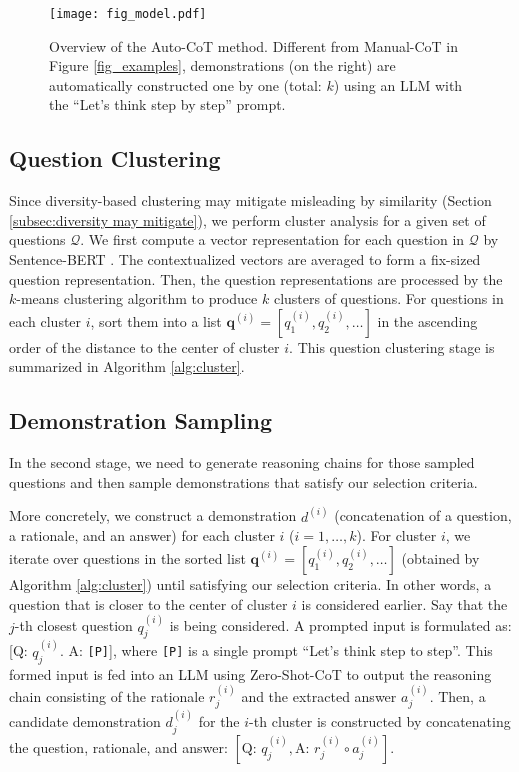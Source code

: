 \begin{figure}[htb]
  \begin{center}
   \texttt{[image: fig\_model.pdf]}
  \end{center}
  \caption{Overview of the Auto-CoT method. Different from Manual-CoT in Figure \ref{fig_examples}, demonstrations (on the right) are automatically constructed one by one (total: $k$) using an LLM with the ``Let's think step by step'' prompt.}
  \label{fig_overview}
\end{figure}

\subsection{Question Clustering} 

Since diversity-based clustering may mitigate misleading by similarity
(Section \ref{subsec:diversity may mitigate}), we perform cluster analysis for a given set of questions $\mathcal{Q}$. 
We first compute a vector representation for each question in $\mathcal{Q}$ by Sentence-BERT \citep{reimers-2019-sentence-bert}. 
The contextualized vectors are averaged to form a fix-sized question representation. Then, the question representations are processed by the $k$-means clustering algorithm
to produce $k$ clusters of questions. For questions in each cluster $i$, sort them into a list $\mathbf{q}^{(i)} = [q_1^{(i)}, q_2^{(i)}, \ldots]$ in the ascending order of the distance to the center of cluster $i$.
This question clustering stage is summarized in Algorithm \ref{alg:cluster}.

\subsection{Demonstration Sampling} 
In the second stage, we need to generate reasoning chains for those sampled questions and then sample demonstrations that satisfy our selection criteria.

More concretely, we construct a demonstration $d^{(i)}$ (concatenation of a question, a rationale, and an answer) for each cluster $i$ ($i=1,\ldots, k$).
For cluster $i$, we iterate over questions in the sorted list $\mathbf{q}^{(i)} = [q_1^{(i)}, q_2^{(i)}, \ldots]$ (obtained by Algorithm \ref{alg:cluster}) until satisfying our selection criteria.
In other words, a question that is closer to the center of cluster $i$ is considered earlier. Say that the $j$-th closest question $q_j^{(i)}$ is being considered.
A prompted input is formulated as: [Q: \texttt{$q_j^{(i)}$}. A: \texttt{[P]}], where \texttt{[P]} is a single prompt ``Let's think step to step''.
This formed input is fed into an LLM using Zero-Shot-CoT \citep{kojima2022large} to output the reasoning chain consisting of the rationale $r_j^{(i)}$ and the extracted answer $a_j^{(i)}$. 
Then, a candidate demonstration $d_j^{(i)}$ for the $i$-th cluster is constructed by concatenating the question, rationale, and answer: $[\text{Q: } q_j^{(i)}, \text{A: } r_j^{(i)} \circ a_j^{(i)}]$.

